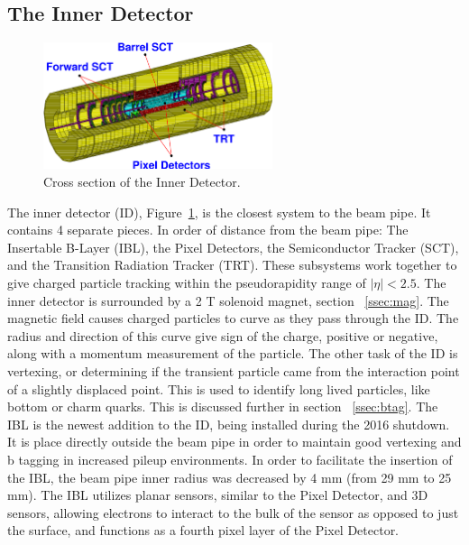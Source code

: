 \subsection{The Inner Detector}
\begin{figure}[h]
\begin{center}
\includegraphics*[width=0.60\textwidth] {figures/inner_3D}%
\caption[Cross section of the Inner Detector.]{Cross section of the Inner Detector.}
\label{fig:ID_cs}
\end{center}
\end{figure}
The inner detector (ID), Figure~\ref{fig:ID_cs}, is the closest system to the beam pipe. It contains 4 separate pieces. In order of distance from the beam pipe: The Insertable B-Layer (IBL), the Pixel Detectors, the Semiconductor Tracker (SCT), and the Transition Radiation Tracker (TRT). These subsystems work together to give charged particle tracking within the pseudorapidity range of ${|\eta| < 2.5}$. The inner detector is surrounded by a 2 T solenoid magnet, section ~\ref{ssec:mag}. The magnetic field causes charged particles to curve as they pass through the ID. The radius and direction of this curve give sign of the charge, positive or negative, along with a momentum measurement of the particle. The other task of the ID is vertexing, or determining if the transient particle came from the interaction point of a slightly displaced point. This is used to identify long lived particles, like bottom or charm quarks. This is discussed further in section ~\ref{ssec:btag}. \linebreak
\indent The IBL is the newest addition to the ID, being installed during the 2016 shutdown. It is place directly outside the beam pipe in order to maintain good vertexing and b tagging in increased pileup environments. In order to facilitate the insertion of the IBL, the beam pipe inner radius was decreased by 4 mm (from 29 mm to 25 mm). The IBL utilizes planar sensors, similar to the Pixel Detector, and 3D sensors, allowing electrons to interact to the bulk of the sensor as opposed to just the surface, and functions as a fourth pixel layer of the Pixel Detector.\linebreak
